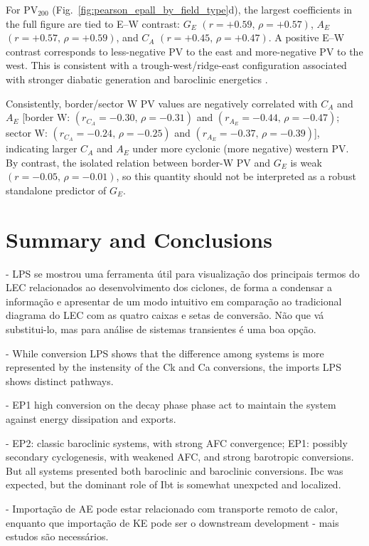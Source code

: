 \documentclass[pdflatex,sn-chicago]{sn-jnl}%
\theoremstyle{plain}
\theoremstyle{definition}
\theoremstyle{remark}
\theoremstyle{definition}
\begin{document}
For $\mathrm{PV}_{200}$ (Fig.~\ref{fig:pearson_epall_by_field_type}d), the largest coefficients in the full figure are tied to E--W contrast: $G_E$ $(r=+0.59,\,\rho=+0.57)$, $A_E$ $(r=+0.57,\,\rho=+0.59)$, and $C_A$ $(r=+0.45,\,\rho=+0.47)$. A positive E--W contrast corresponds to less-negative PV to the east and more-negative PV to the west. This is consistent with a trough-west/ridge-east configuration associated with stronger diabatic generation and baroclinic energetics \citep{hoskins1985use,davis1991potential}.

Consistently, border/sector W PV values are negatively correlated with $C_A$ and $A_E$ [border W: $(r_{C_A}=-0.30,\,\rho=-0.31)$ and $(r_{A_E}=-0.44,\,\rho=-0.47)$; sector W: $(r_{C_A}=-0.24,\,\rho=-0.25)$ and $(r_{A_E}=-0.37,\,\rho=-0.39)$], indicating larger $C_A$ and $A_E$ under more cyclonic (more negative) western PV. By contrast, the isolated relation between border-W PV and $G_E$ is weak $(r=-0.05,\,\rho=-0.01)$, so this quantity should not be interpreted as a robust standalone predictor of $G_E$.

\section{Summary and Conclusions}

- LPS se mostrou uma ferramenta útil para visualização dos principais termos do LEC relacionados ao desenvolvimento dos ciclones, de forma a condensar a informação e apresentar de um modo intuitivo em comparação ao tradicional diagrama do LEC com as quatro caixas e setas de conversão. Não que vá substitui-lo, mas para análise de sistemas transientes é uma boa opção.

-  While conversion LPS shows that the difference among systems is more represented by the instensity of the Ck and Ca conversions, the imports LPS shows distinct pathways.

- EP1 high conversion on the decay phase phase act to maintain the system against energy dissipation \citep{de2025lorenz} and exports.

- EP2: classic baroclinic systems, with strong AFC convergence; EP1: possibly secondary cyclogenesis, with weakened AFC, and strong barotropic conversions. But all systems presented both baroclinic and baroclinic conversions. Ibc was expected, but the dominant role of Ibt is somewhat unexpcted and localized. 

- Importação de AE pode estar relacionado com transporte remoto de calor, enquanto que importação de KE pode ser o downstream development - mais estudos são necessários.
\end{document}
